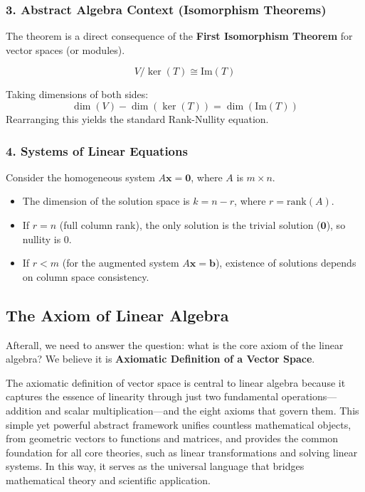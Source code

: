 \documentclass[oneside]{book}
\begin{document}
\subsubsection{3. Abstract Algebra Context (Isomorphism Theorems)}
The theorem is a direct consequence of the \textbf{First Isomorphism Theorem} for vector spaces (or modules).
\begin{theorem}
\[ V / \ker(T) \cong \text{Im}(T) \]
\end{theorem}
Taking dimensions of both sides:
\[ \dim(V) - \dim(\ker(T)) = \dim(\text{Im}(T)) \]
Rearranging this yields the standard Rank-Nullity equation.

\subsubsection{4. Systems of Linear Equations}
Consider the homogeneous system $A\mathbf{x} = \mathbf{0}$, where $A$ is $m \times n$.
\begin{itemize}
    \item The dimension of the solution space is $k = n - r$, where $r = \text{rank}(A)$.
    \item If $r = n$ (full column rank), the only solution is the trivial solution ($\mathbf{0}$), so nullity is 0.
    \item If $r < m$ (for the augmented system $A\mathbf{x}=\mathbf{b}$), existence of solutions depends on column space consistency.
\end{itemize}

\subsection{The Axiom of Linear Algebra}
Afterall, we need to answer the question: what is the core axiom of the linear algebra? We believe it is \textbf{Axiomatic Definition of a Vector Space}.

The axiomatic definition of vector space is central to linear algebra because it captures the essence of linearity through just two fundamental operations—addition and scalar multiplication—and the eight axioms that govern them. This simple yet powerful abstract framework unifies countless mathematical objects, from geometric vectors to functions and matrices, and provides the common foundation for all core theories, such as linear transformations and solving linear systems. In this way, it serves as the universal language that bridges mathematical theory and scientific application.
\end{document}
